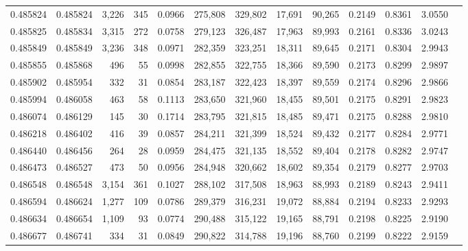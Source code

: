 \begin{tabular}{rrrrrrrrrrrrr}
0.485824 & 0.485824 & 3,226 &   345 &                                     0.0966 & 275,808 & 329,802 &  17,691 &  90,265 & 0.2149 & 0.8361 & 3.0550 \\
0.485825 & 0.485834 & 3,315 &   272 &                                     0.0758 & 279,123 & 326,487 &  17,963 &  89,993 & 0.2161 & 0.8336 & 3.0243 \\
0.485849 & 0.485849 & 3,236 &   348 &                                     0.0971 & 282,359 & 323,251 &  18,311 &  89,645 & 0.2171 & 0.8304 & 2.9943 \\
0.485855 & 0.485868 &   496 &    55 &                                     0.0998 & 282,855 & 322,755 &  18,366 &  89,590 & 0.2173 & 0.8299 & 2.9897 \\
0.485902 & 0.485954 &   332 &    31 &                                     0.0854 & 283,187 & 322,423 &  18,397 &  89,559 & 0.2174 & 0.8296 & 2.9866 \\
0.485994 & 0.486058 &   463 &    58 &                                     0.1113 & 283,650 & 321,960 &  18,455 &  89,501 & 0.2175 & 0.8291 & 2.9823 \\
0.486074 & 0.486129 &   145 &    30 &                                     0.1714 & 283,795 & 321,815 &  18,485 &  89,471 & 0.2175 & 0.8288 & 2.9810 \\
0.486218 & 0.486402 &   416 &    39 &                                     0.0857 & 284,211 & 321,399 &  18,524 &  89,432 & 0.2177 & 0.8284 & 2.9771 \\
0.486440 & 0.486456 &   264 &    28 &                                     0.0959 & 284,475 & 321,135 &  18,552 &  89,404 & 0.2178 & 0.8282 & 2.9747 \\
0.486473 & 0.486527 &   473 &    50 &                                     0.0956 & 284,948 & 320,662 &  18,602 &  89,354 & 0.2179 & 0.8277 & 2.9703 \\
0.486548 & 0.486548 & 3,154 &   361 &                                     0.1027 & 288,102 & 317,508 &  18,963 &  88,993 & 0.2189 & 0.8243 & 2.9411 \\
0.486594 & 0.486624 & 1,277 &   109 &                                     0.0786 & 289,379 & 316,231 &  19,072 &  88,884 & 0.2194 & 0.8233 & 2.9293 \\
0.486634 & 0.486654 & 1,109 &    93 &                                     0.0774 & 290,488 & 315,122 &  19,165 &  88,791 & 0.2198 & 0.8225 & 2.9190 \\
0.486677 & 0.486741 &   334 &    31 &                                     0.0849 & 290,822 & 314,788 &  19,196 &  88,760 & 0.2199 & 0.8222 & 2.9159 \\

\end{tabular}
